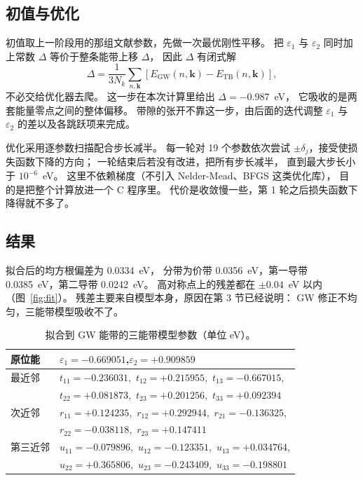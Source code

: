 \documentclass[11pt,a4paper]{ctexart}
\newcommand{\kk}{\mathbf{k}}
\newcommand{\eps}{\varepsilon}
\begin{document}
\subsection{初值与优化}

初值取上一阶段用的那组文献参数\cite{liu2013}，先做一次最优刚性平移。
把 $\eps_1$ 与 $\eps_2$ 同时加上常数 $\Delta$ 等价于整条能带上移 $\Delta$，
因此 $\Delta$ 有闭式解
\begin{equation}
\Delta=\frac{1}{3N_k}\sum_{n,\kk}\left[E_{\mathrm{GW}}(n,\kk)-E_{\mathrm{TB}}(n,\kk)\right],
\end{equation}
不必交给优化器去爬。
这一步在本次计算里给出 $\Delta=-0.987$~eV，
它吸收的是两套能量零点之间的整体偏移。
带隙的张开不靠这一步，由后面的迭代调整 $\eps_1$ 与 $\eps_2$ 的差以及各跳跃项来完成。

优化采用逐参数扫描配合步长减半。
每一轮对 19 个参数依次尝试 $\pm\delta_j$，接受使损失函数下降的方向；
一轮结束后若没有改进，把所有步长减半，
直到最大步长小于 $10^{-6}$~eV。
这里不依赖梯度（不引入 Nelder-Mead、BFGS 这类优化库），
目的是把整个计算放进一个 C 程序里。
代价是收敛慢一些，第 1 轮之后损失函数下降得就不多了。

\subsection{结果}

拟合后的均方根偏差为 0.0334~eV，
分带为价带 0.0356~eV，第一导带 0.0385~eV，第二导带 0.0242~eV。
高对称点上的残差都在 $\pm0.04$~eV 以内（图~\ref{fig:fit}）。
残差主要来自模型本身，原因在第 3 节已经说明：
GW 修正不均匀，三能带模型吸收不了。

\begin{table}[htbp]
\centering
\caption{拟合到 GW 能带的三能带模型参数（单位 eV）。}
\label{tab:params}
\begin{tabular}{@{}ll@{}}
\toprule
原位能 & $\eps_1=-0.669051$,\quad $\eps_2=+0.909859$\\
\midrule
最近邻 & $t_{11}=-0.236031$,\ $t_{12}=+0.215955$,\ $t_{13}=-0.667015$,\\
       & $t_{22}=+0.081873$,\ $t_{23}=+0.201256$,\ $t_{33}=+0.092394$\\
次近邻 & $r_{11}=+0.124235$,\ $r_{12}=+0.292944$,\ $r_{21}=-0.136325$,\\
       & $r_{22}=-0.038118$,\ $r_{23}=+0.147411$\\
第三近邻 & $u_{11}=-0.079896$,\ $u_{12}=-0.123351$,\ $u_{13}=+0.034764$,\\
       & $u_{22}=+0.365806$,\ $u_{23}=-0.243409$,\ $u_{33}=-0.198801$\\
\bottomrule
\end{tabular}
\end{table}
\end{document}
